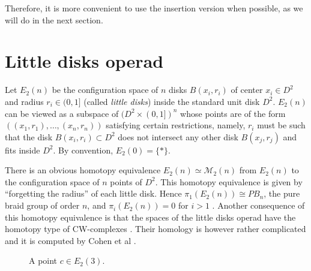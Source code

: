 \documentclass[TFM.tex]{subfiles}
\begin{document}
Therefore, it is more convenient to use the insertion version when possible, as we will do in the next section. 



\section{Little disks operad}\label{little}
 
 
 Let $E_2(n)$ be the configuration space of $n$ disks $B(x_i,r_i)$ of center $x_i\in D^2$ and radius $r_i\in (0,1]$ (called \emph{little disks}) inside the standard unit disk $D^2$. $E_2(n)$ can be viewed as a subspace of $(D^2\times (0,1])^n$ whose points are of the form $((x_1,r_1),\dots, (x_n,r_n))$ satisfying certain restrictions, namely, $r_i$ must be such that the disk $B(x_i,r_i)\subset D^2$ does not intersect any other disk $B(x_j,r_j)$ and fits inside $D^2$. By convention, $E_2(0)=\{*\}$.  
 
 There is an obvious homotopy equivalence $E_2(n)\simeq \mathcal{M}_2(n)$ from $E_2(n)$ to the configuration space of $n$ points of $D^2$. This homotopy equivalence is given by ``forgetting the radius'' of each little disk. %
   Hence $\pi_1(E_2(n))\cong PB_n$, the pure braid group of order $n$, and $\pi_i(E_2(n))=0$ for $i>1$ \cite{fox}. Another consequence of this homotopy equivalence is that the spaces of the little disks operad have the homotopy type of CW-complexes \cite{CW}. Their homology is however rather complicated and it is computed by Cohen et al \cite{cuentas}.  
 
 

\begin{figure}[h!]
\caption{A point $c\in E_2(3)$.}
 \end{figure}
 
\end{document}
